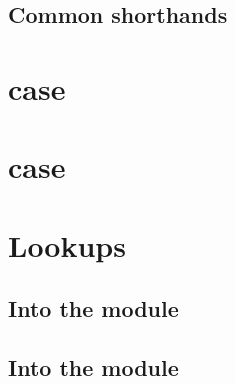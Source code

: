 \subsection{Common shorthands}                                             \label{stp: constraints: shorthands}      

\section{ case}                                               \label{stp: creates}                      

\section{ case}                                                 \label{stp: calls}                        

\section{Lookups}
\subsection{Into the \wcpMod{} module}                                     \label{stp: lookups: wcp}                 
\subsection{Into the \modMod{} module}                                     \label{stp: lookups: mod}                 
